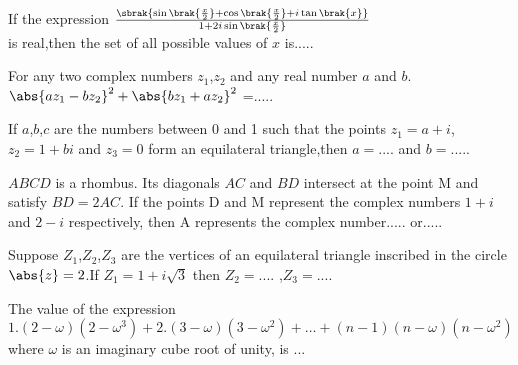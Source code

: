 \iffalse
\title{assignment}
\author{Tanush Sri Sai Petla}
\section{fitb}
\fi
\item If the expression 
$\frac{\sbrak{\sin{\brak{{\frac{x}{2}}}}+\cos{\brak{{\frac{x}{2}}}}+i\tan{\brak{x}}}}{1+2i\sin{\brak{\frac{x}{2}}}}$\hfill{}\\
is real,then the set of all possible values of $x$ is..... 
\item For any two complex numbers $z_1$,$z_2$ and any real number $a$ and $b$.
$\abs{az_1-bz_2}^2+\abs{bz_1+az_2}^2$ =.....  \hfill{}
\item If $a$,$b$,$c$ are the numbers between 0 and 1 such that the points $z_1=a+i$, $z_2=1+bi$ and $z_3=0$ form an equilateral triangle,then $a=....$ and $b=.....$ \hfill{}
\item $ABCD$ is a rhombus. Its diagonals $AC$ and $BD$ intersect at the point M and satisfy $BD=2AC$. If the points D and M represent the complex numbers $1+i$ and $2-i$ respectively, then A represents the complex number..... or..... \hfill{}
\item Suppose $Z_1$,$Z_2$,$Z_3$ are the vertices of an equilateral triangle inscribed in the circle $\abs{z}=2$.If $Z_1=1+i\sqrt{3}$ then $Z_2=....$ ,$Z_3=.... $ \hfill{}
\item The value of the expression $1.(2 - \omega)(2 - \omega^3) + 2.(3 - \omega)(3 - \omega^2) + \dots + (n-1)(n - \omega)(n - \omega^2)$ where $\omega$ is an imaginary cube root of unity, is $...$ \hfill{}

